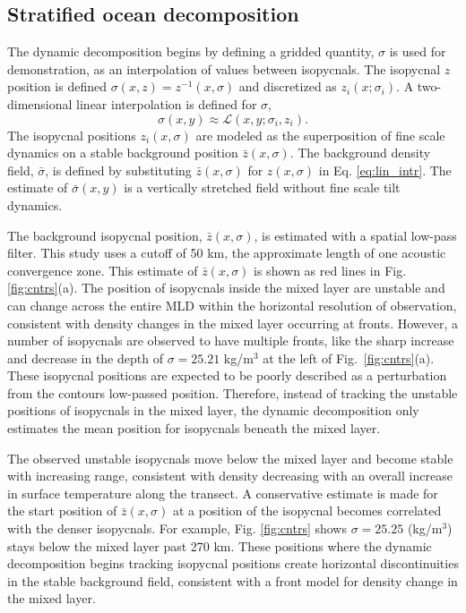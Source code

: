 \documentclass[preprint,NumberedRefs]{JASA}
\begin{document}
\subsection{Stratified ocean decomposition}
The dynamic decomposition begins by defining a gridded quantity, $\sigma$ is used for demonstration, as an interpolation of values between isopycnals. The isopycnal $z$ position is defined $\sigma(x, z) = z^{-1}(x, \sigma)$ and discretized as $z_i(x; \sigma_i)$. A two-dimensional linear interpolation is defined for $\sigma$,
\begin{equation}
    \sigma(x,y)\approx\mathcal{L}(x, y; \sigma_i, z_i).
    \label{eq:lin_intr}
\end{equation}
The isopycnal positions $z_i(x, \sigma)$ are modeled as the superposition of fine scale dynamics on a stable background position $\bar{z}(x, \sigma)$. The background density field, $\bar{\sigma}$, is defined by substituting $\bar{z}(x, \sigma)$ for $z(x, \sigma)$ in Eq. \eqref{eq:lin_intr}. The estimate of $\bar{\sigma}(x,y)$ is a vertically stretched field without fine scale tilt dynamics.

The background isopycnal position, $\bar{z}(x, \sigma)$, is estimated with a spatial low-pass filter. This study uses a cutoff of 50 km, the approximate length of one acoustic convergence zone\cite{jensen2011computational}. This estimate of $\bar{z}(x, \sigma)$ is shown as red lines in Fig. \ref{fig:cntrs}(a). The position of isopycnals inside the mixed layer are unstable and can change across the entire MLD within the horizontal resolution of observation, consistent with density changes in the mixed layer occurring at fronts. However, a number of isopycnals are observed to have multiple fronts, like the sharp increase and decrease in the depth of $\sigma=25.21$ kg/m$^3$ at the left of Fig.~\ref{fig:cntrs}(a). These isopycnal positions are expected to be poorly described as a perturbation from the contours low-passed position. Therefore, instead of tracking the unstable positions of isopycnals in the mixed layer, the dynamic decomposition only estimates the mean position for isopycnals beneath the mixed layer.

The observed unstable isopycnals move below the mixed layer and become stable with increasing range, consistent with density decreasing with an overall increase in surface temperature along the transect. A conservative estimate is made for the start position of $\bar{z}(x, \sigma)$ at a position of the isopycnal becomes correlated with the denser isopycnals. For example, Fig. \ref{fig:cntrs} shows $\sigma=25.25$ (kg/m$^3$) stays below the mixed layer past 270 km. These positions where the dynamic decomposition begins tracking isopycnal positions create horizontal discontinuities in the stable background field, consistent with a front model for density change in the mixed layer.
\end{document}
